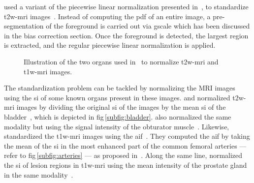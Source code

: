 \begin{enumerate}[leftmargin=*]
\citeauthor{Viswanath2012} used a variant of the piecewise linear normalization
presented in~\cite{Madabhushi2006a}, to standardize \ac{t2w}-\ac{mri}
images~\cite{Viswanath2009,Viswanath2011,Viswanath2012}.
Instead of computing the \ac{pdf} of an entire image, a pre-segmentation of the
foreground is carried out via \ac{gscale} which has been discussed in the bias
correction section.
Once the foreground is detected, the largest region is extracted, and the
regular piecewise linear normalization is applied.

\begin{figure}
  \centering
  \hspace*{\fill}
  \hfill
  \hspace*{\fill}
  \caption{Illustration of the two organs used in~\cite{Niaf2011,Niaf2012} to
    normalize \acs*{t2w}-\acs*{mri} and \acs*{t1w}-\acs*{mri} images.}
  \label{fig:niaf}
\end{figure}

The standardization problem can be tackled by normalizing the MRI images using
the \ac{si} of some known organs present in these images.
\citeauthor{Niaf2012} and \citeauthor{lehaire2014computer} normalized
\ac{t2w}-\ac{mri} images by dividing the original \ac{si} of the images by the
mean \ac{si} of the bladder~\cite{Niaf2011,Niaf2012,lehaire2014computer}, which
is depicted in \acs{fig}\,\ref{subfig:bladder}.
\citeauthor{giannini2015fully} also normalized the same modality but using the
signal intensity of the obturator muscle~\cite{giannini2015fully}.
Likewise, \citeauthor{Niaf2011} standardized the \ac{t1w}-\ac{mri} images using
the \ac{aif}~\cite{Niaf2011}.
They computed the \ac{aif} by taking the mean of the \ac{si} in the most
enhanced part of the common femoral arteries --- refer to
\acs{fig}\,\ref{subfig:arteries} --- as proposed in~\cite{Wiart2007}.
Along the same line, \citeauthor{samarasinghe2016semi} normalized the \ac{si}
of lesion regions in \ac{t1w}-\ac{mri} using the mean intensity of the prostate
gland in the same modality~\cite{samarasinghe2016semi}.


\end{enumerate}
